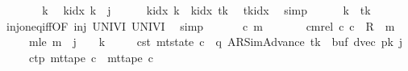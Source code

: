 \begin{isabellebody}
\ {\isacharminus}{\kern0pt}\isanewline
\ \ \ \ \isamarkupfalse%
\ k\ \isamarkupfalse%
\ {\isachardoublequoteopen}k{\isacharunderscore}{\kern0pt}idx\ k\ {\isacharequal}{\kern0pt}\ j{\isachardoublequoteclose}\isanewline
\ \ \ \ \isamarkupfalse%
\ {\isachardoublequoteopen}k{\isacharunderscore}{\kern0pt}idx\ k\ {\isacharequal}{\kern0pt}\ k{\isacharunderscore}{\kern0pt}idx\ {\isacharquery}{\kern0pt}tk{\isachardoublequoteclose}\ \isamarkupfalse%
\ tkidx\ \isamarkupfalse%
\ simp\isanewline
\ \ \ \ \isamarkupfalse%
\ {\isachardoublequoteopen}k\ {\isacharequal}{\kern0pt}\ {\isacharquery}{\kern0pt}tk{\isachardoublequoteclose}\ \isamarkupfalse%
\ inj{\isacharunderscore}{\kern0pt}on{\isacharunderscore}{\kern0pt}eq{\isacharunderscore}{\kern0pt}iff{\isacharbrackleft}{\kern0pt}OF\ inj\ UNIV{\isacharunderscore}{\kern0pt}I\ UNIV{\isacharunderscore}{\kern0pt}I{\isacharbrackright}{\kern0pt}\ \isamarkupfalse%
\ simp\isanewline
\ \ \isamarkupfalse%
\isanewline
\ \ \isamarkupfalse%
\ c\ m\ \isanewline
\ \ \ \ \ \ cm{\isacharunderscore}{\kern0pt}rel{\isacharcolon}{\kern0pt}\ {\isachardoublequoteopen}{\isacharparenleft}{\kern0pt}c{}{\isacharcomma}{\kern0pt}\ c{\isacharparenright}{\kern0pt}\ {\isasymin}\ {\isacharquery}{\kern0pt}R\ {\isacharcircum}{\kern0pt}{\isacharcircum}{\kern0pt}\ m{\isachardoublequoteclose}\isanewline
\ \ \ \ \ m{\isacharunderscore}{\kern0pt}le{\isacharcolon}{\kern0pt}\ {\isachardoublequoteopen}m\ {\isasymle}\ j\ {\isacharasterisk}{\kern0pt}\ {\isacharparenleft}{\kern0pt}{}\ {\isacharasterisk}{\kern0pt}\ {\isacharquery}{\kern0pt}k{\isacharparenright}{\kern0pt}{\isachardoublequoteclose}\isanewline
\ \ \ \ \ c{\isacharunderscore}{\kern0pt}st{\isacharcolon}{\kern0pt}\ {\isachardoublequoteopen}mt{\isacharunderscore}{\kern0pt}state\ c\ {\isacharequal}{\kern0pt}\ {\isacharparenleft}{\kern0pt}q{\isacharcomma}{\kern0pt}\ AR{\isacharunderscore}{\kern0pt}SimAdvance{\isacharcomma}{\kern0pt}\ {\isacharquery}{\kern0pt}tk{\isacharcomma}{\kern0pt}\ {}{\isacharcomma}{\kern0pt}\ buf{}{\isacharcomma}{\kern0pt}\ dvec{\isacharcomma}{\kern0pt}\ {\isacharquery}{\kern0pt}pk\ j{\isacharparenright}{\kern0pt}{\isachardoublequoteclose}\isanewline
\ \ \ \ \ c{\isacharunderscore}{\kern0pt}tp{\isacharcolon}{\kern0pt}\ {\isachardoublequoteopen}mt{\isacharunderscore}{\kern0pt}tape\ c\ {\isacharequal}{\kern0pt}\ mt{\isacharunderscore}{\kern0pt}tape\ c{}{\isachardoublequoteclose}\isanewline

\end{isabellebody}
